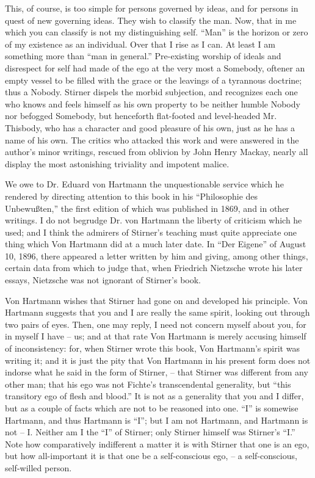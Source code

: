 This, of course, is too simple for persons governed by ideas, and for persons 
in quest of new governing ideas. They wish to classify the man. Now, that in 
me which you can classify is not my distinguishing self. ``Man'' is the 
horizon or zero of my existence as an individual. Over that I rise as I can. 
At least I am something more than ``man in general.'' Pre-existing worship 
of ideals and disrespect for self had made of the ego at the very most a 
Somebody, oftener an empty vessel to be filled with the grace or the leavings 
of a tyrannous doctrine; thus a Nobody. Stirner dispels the morbid subjection, 
and recognizes each one who knows and feels himself as his own property to be 
neither humble Nobody nor befogged Somebody, but henceforth flat-footed and 
level-headed Mr. Thisbody, who has a character and good pleasure of his own, 
just as he has a name of his own. The critics who attacked this work and were 
answered in the author's minor writings, rescued from oblivion by John Henry 
Mackay, nearly all display the most astonishing triviality and impotent 
malice.

We owe to Dr. Eduard von Hartmann the unquestionable service which he rendered 
by directing attention to this book in his ``Philosophie des 
Unbewu\ss{}ten,'' the first edition of which was published in 1869, and in 
other writings. I do not begrudge Dr. von Hartmann the liberty of criticism 
which he used; and I think the admirers of Stirner's teaching must quite 
appreciate one thing which Von Hartmann did at a much later date. In ``Der 
Eigene'' of August 10, 1896, there appeared a letter written by him and 
giving, among other things, certain data from which to judge that, when 
Friedrich Nietzsche wrote his later essays, Nietzsche was not ignorant of 
Stirner's book.

Von Hartmann wishes that Stirner had gone on and developed his principle. Von 
Hartmann suggests that you and I are really the same spirit, looking out 
through two pairs of eyes. Then, one may reply, I need not concern myself 
about you, for in myself I have -- us; and at that rate Von Hartmann is merely 
accusing himself of inconsistency: for, when Stirner wrote this book, Von 
Hartmann's spirit was writing it; and it is just the pity that Von Hartmann in 
his present form does not indorse what he said in the form of Stirner, -- that 
Stirner was different from any other man; that his ego was not Fichte's 
transcendental generality, but ``this transitory ego of flesh and blood.'' 
It is not as a generality that you and I differ, but as a couple of facts 
which are not to be reasoned into one. ``I'' is somewise Hartmann, and thus 
Hartmann is ``I''; but I am not Hartmann, and Hartmann is not -- I. Neither 
am I the ``I'' of Stirner; only Stirner himself was Stirner's ``I.'' Note 
how comparatively indifferent a matter it is with Stirner that one is an ego, 
but how all-important it is that one be a self-conscious ego, -- a 
self-conscious, self-willed person.

